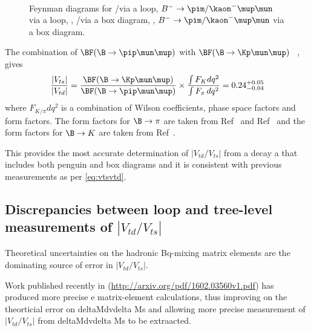 \begin{figure}[!h]\def\nh{0.5\textwidth}
  \centering
  \hspace*{-1cm}
  \\
  \hspace*{-1cm}
  \caption{Feynman diagrams for \protect{} \Lb\to\proton\pim/\Km\mup\mun via a loop,  \protect{} $B^{-}\to\pim/\kaon^{-}\mup\mun$ via a loop,  \protect{}, \Lb\to\proton\pim/\Km\mup\mun via a box diagram,
   \protect{}, $B^{-}\to\pim/\kaon^{-}\mup\mun$ via a box diagram.
  }
  \label{fig:boxpeng}
\end{figure}
The combination of $\BF(\B\to\pip\mun\mup)$ with $\BF(\B\to\Kp\mun\mup)$ ~\cite{bKmumu},  gives
\begin{equation}
  \frac{|V_{ts}|}{|V_{td}|} = \frac{\BF(\B\to\Kp\mun\mup)}{\BF(\B\to\pip\mun\mup)} \times \frac{\int F_{K}d q^{2}}{\int F_{\pi}\,dq^{2}} = 0.24^{+0.05}_{-0.04}
  \end{equation}
where $F_{K/\pi}d q^{2}$ is a combination of Wilson coefficients, phase space factors and form factors. The form factors for $\B\to\pi$ are taken from Ref~\cite{bpimumuff1} and Ref~\cite{bpimumuff2} and the form factors for $\B\to K$ are taken from Ref~\cite{bKmumuff1}.

This provides the most accurate determination of $|V_{td}/V_{ts}|$ from a decay a that includes both penguin and box diagrams and it is consistent with previous measurements as per \autoref{eq:vtsvtd}.

\subsection{Discrepancies between loop and tree-level measurements of $|V_{td}/V_{ts}|$}
Theoretical uncertainties on the hadronic Bq-mixing matrix elements are the dominating source of error in $|V_{td}/V_{ts}|$.

Work published recently in (\url{http://arxiv.org/pdf/1602.03560v1.pdf}) has produced more precise e matrix-element calculations, thus improving on the theorticial error on deltaMdvdelta Ms and allowing more precise measurement of $|V_{td}/V_{ts}|$ from deltaMdvdelta Ms to be extraacted.

